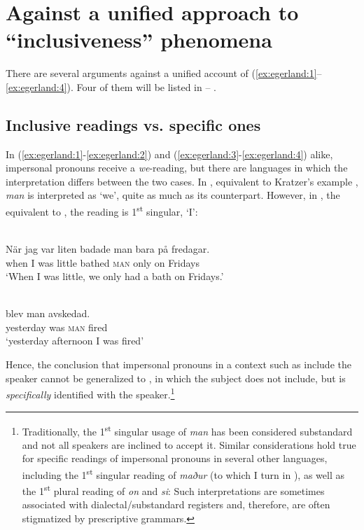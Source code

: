 \documentclass[output=paper]{LSP/langsci}
\begin{document}
\section{Against a unified approach to “inclusiveness” phenomena}\label{sec:egerland:2}

There are several arguments against a unified account of (\ref{ex:egerland:1}--\ref{ex:egerland:4}). Four of them will be listed in  -- .

\subsection{Inclusive readings vs. specific ones}\label{sec:egerland:2.1}
In  (\ref{ex:egerland:1}-\ref{ex:egerland:2}) and  (\ref{ex:egerland:3}-\ref{ex:egerland:4}) alike, impersonal pronouns receive a \textit{we}-reading, but there are languages in which the interpretation differs between the two cases. In  , equivalent to Kratzer’s example , \textit{man} is interpreted as ‘we’, quite as much as its  counterpart. However, in , the equivalent to , the reading is 1\textsuperscript{st} singular, ‘I’:

\ea\label{ex:egerland:5}
\\
\gll När  jag  var  liten  badade  man  bara  på  fredagar.\\
when  I    was  little  bathed  \textsc{man}  only  on  Fridays\\
\glt ‘When I was little, we only had a bath on Fridays.’
\z

\newpage 
\ea\label{ex:egerland:6}
\\
      blev  man  avskedad.\\
yesterday  was  \textsc{man}  fired\\
\glt ‘yesterday afternoon I was fired’
\z

Hence, the conclusion that impersonal pronouns in a context such as  include the speaker cannot be generalized to  , in which the subject does not include, but is \textit{specifically} identified with the speaker.\footnote{\label{fn:egerland:3}Traditionally, the 1\textsuperscript{st} singular usage of \textit{man} has been considered substandard and not all speakers are inclined to accept it. Similar considerations hold true for specific readings of impersonal pronouns in several other languages, including the 1\textsuperscript{st} singular reading of  \textit{maður} (to which I turn in ), as well as the 1\textsuperscript{st} plural reading of  \textit{on} and  \textit{si}: Such interpretations are sometimes associated with dialectal\slash substandard registers and, therefore, are often stigmatized by prescriptive grammars.}
\end{document}
